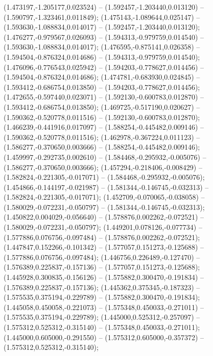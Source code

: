  (1.473197,-1.205177,0.023524) -- (1.592457,-1.203440,0.013120) -- (1.590797,-1.323461,0.011849);
 (1.475143,-1.089644,0.025147) -- (1.593630,-1.088834,0.014017) -- (1.592457,-1.203440,0.013120);
 (1.476277,-0.979567,0.026093) -- (1.594313,-0.979759,0.014540) -- (1.593630,-1.088834,0.014017);
 (1.476595,-0.875141,0.026358) -- (1.594504,-0.876324,0.014686) -- (1.594313,-0.979759,0.014540);
 (1.476096,-0.776543,0.025942) -- (1.594203,-0.778627,0.014456) -- (1.594504,-0.876324,0.014686);
 (1.474781,-0.683930,0.024845) -- (1.593412,-0.686754,0.013850) -- (1.594203,-0.778627,0.014456);
 (1.472655,-0.597440,0.023071) -- (1.592130,-0.600783,0.012870) -- (1.593412,-0.686754,0.013850);
 (1.469725,-0.517190,0.020627) -- (1.590362,-0.520778,0.011516) -- (1.592130,-0.600783,0.012870);
 (1.466239,-0.441916,0.017097) -- (1.588254,-0.445482,0.009146) -- (1.590362,-0.520778,0.011516);
 (1.462978,-0.367224,0.011123) -- (1.586277,-0.370650,0.003666) -- (1.588254,-0.445482,0.009146);
 (1.459997,-0.292735,0.002610) -- (1.584468,-0.295932,-0.005076) -- (1.586277,-0.370650,0.003666);
 (1.457294,-0.218406,-0.008429) -- (1.582824,-0.221305,-0.017071) -- (1.584468,-0.295932,-0.005076);
 (1.454866,-0.144197,-0.021987) -- (1.581344,-0.146745,-0.032313) -- (1.582824,-0.221305,-0.017071);
 (1.452709,-0.070065,-0.038058) -- (1.580029,-0.072231,-0.050797) -- (1.581344,-0.146745,-0.032313);
 (1.450822,0.004029,-0.056640) -- (1.578876,0.002262,-0.072521) -- (1.580029,-0.072231,-0.050797);
 (1.449201,0.078126,-0.077734) -- (1.577886,0.076756,-0.097484) -- (1.578876,0.002262,-0.072521);
 (1.447847,0.152266,-0.101342) -- (1.577057,0.151273,-0.125688) -- (1.577886,0.076756,-0.097484);
 (1.446756,0.226489,-0.127470) -- (1.576389,0.225837,-0.157136) -- (1.577057,0.151273,-0.125688);
 (1.445928,0.300835,-0.156126) -- (1.575882,0.300470,-0.191834) -- (1.576389,0.225837,-0.157136);
 (1.445362,0.375345,-0.187323) -- (1.575535,0.375194,-0.229789) -- (1.575882,0.300470,-0.191834);
 (1.445058,0.450058,-0.221073) -- (1.575348,0.450033,-0.271011) -- (1.575535,0.375194,-0.229789);
 (1.445000,0.525312,-0.257097) -- (1.575312,0.525312,-0.315140) -- (1.575348,0.450033,-0.271011);
 (1.445000,0.605000,-0.291550) -- (1.575312,0.605000,-0.357372) -- (1.575312,0.525312,-0.315140);
